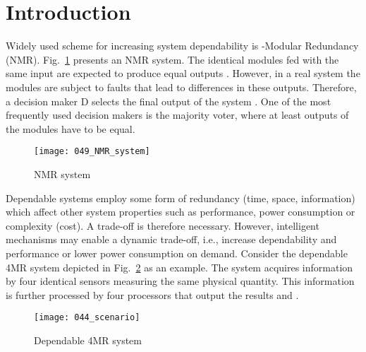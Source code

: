 \documentclass[technote, a4paper, onecolumn]{IEEEtran}  \newcommand{\avtor}{Aleksandar Simevski}
\begin{document}
\section{Introduction}\label{sec_introduction} 

Widely used scheme for increasing system dependability is -Modular Redundancy (NMR). Fig.~\ref{fig_nmr_sys} presents an NMR system. The  identical modules  fed with the same input  are expected to produce equal outputs . However, in a real system the modules are subject to faults that lead to differences in these outputs. Therefore, a decision maker D selects the final output of the system . One of the most frequently used decision makers is the majority voter, where at least  outputs of the  modules have to be equal.

\begin{figure}[!ht]
    \centerline{\texttt{[image: 049\_NMR\_system]}}
    \caption{NMR system}
    \label{fig_nmr_sys}
\end{figure}

Dependable systems employ some form of redundancy (time, space, information) which affect other system properties such as performance, power consumption or complexity (cost). A trade-off is therefore necessary. However, intelligent mechanisms may enable a dynamic trade-off, i.e., increase dependability and performance or lower power consumption on demand. Consider the dependable 4MR system depicted in Fig.~\ref{fig_dep_sys} as an example. The system acquires information by four identical sensors measuring the same physical quantity. This information is further processed by four processors that output the results  and .

\begin{figure}[!ht]
    \centerline{\texttt{[image: 044\_scenario]}}
    \caption{Dependable 4MR system}
    \label{fig_dep_sys}
\end{figure}
\end{document}
